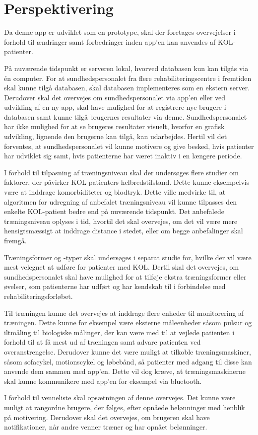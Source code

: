 \section{Perspektivering}
Da denne app er udviklet som en prototype, skal der foretages overvejelser i forhold til ændringer samt forbedringer inden app'en kan anvendes af KOL-patienter. 

På nuværende tidspunkt er serveren lokal, hvorved databasen kun kan tilgås via én computer. For at sundhedspersonalet fra flere rehabiliteringscentre i fremtiden skal kunne tilgå databasen, skal databasen implementeres som en ekstern server. Derudover skal det overvejes om sundhedspersonalet via app’en eller ved udvikling af en ny app, skal have mulighed for at registrere nye brugere i databasen samt kunne tilgå brugernes resultater via denne. Sundhedspersonalet har ikke mulighed for at se brugeres resultater visuelt, hvorfor en grafisk udvikling, lignende den brugerne kan tilgå, kan udarbejdes. Hertil vil det forventes, at sundhedspersonalet vil kunne motivere og give besked, hvis patienter har udviklet sig samt, hvis patienterne har været inaktiv i en længere periode. 

I forhold til tilpasning af træningsniveau skal der undersøges flere studier om faktorer, der påvirker KOL-patienters helbredstilstand. Dette kunne eksempelvis være at inddrage komorbiditeter og blodtryk. Dette ville medvirke til, at algoritmen for udregning af anbefalet træningsniveau vil kunne tilpasses den enkelte KOL-patient bedre end på nuværende tidspunkt. Det anbefalede træningsniveau oplyses i tid, hvortil det skal overvejes, om det vil være mere hensigtsmæssigt at inddrage distance i stedet, eller om begge anbefalinger skal fremgå. 

Træningsformer og -typer skal undersøges i separat studie for, hvilke der vil være mest velegnet at udføre for patienter med KOL. Dertil skal det overvejes, om sundhedspersonalet skal have mulighed for at tilføje ekstra træningsformer eller øvelser, som patienterne har udført og har kendskab til i forbindelse med rehabiliteringsforløbet.

Til træningen kunne det overvejes at inddrage flere enheder til monitorering af træningen. Dette kunne for eksempel være eksterne måleenheder såsom pulsur og iltmåling til biologiske målinger, der kan være med til at vejlede patienten i forhold til at få mest ud af træningen samt advare patienten ved overanstrengelse. Derudover kunne det være muligt at tilkoble træningsmaskiner, såsom sofacykel, motionscykel og løbebånd, så patienter med adgang til disse kan anvende dem sammen med app’en. Dette vil dog kræve, at træningsmaskinerne skal kunne kommunikere med app’en for eksempel via bluetooth. 

I forhold til venneliste skal opsætningen af denne overvejes. Det kunne være muligt at rangordne brugere, der følges, efter opnåede belønninger med henblik på motivering. Derudover skal det overvejes, om brugeren skal have notifikationer, når andre venner træner og har opnået belønninger. 